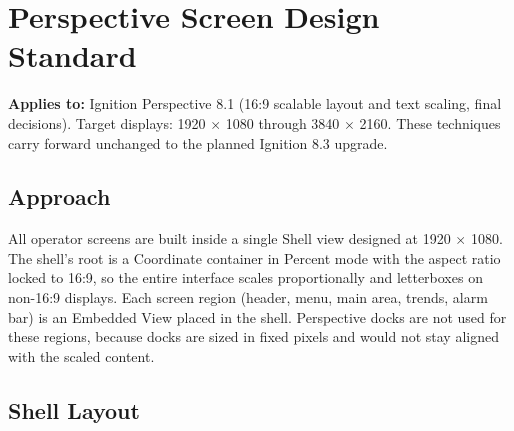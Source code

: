 \chapter{Perspective Screen Design Standard}
\label{app:screen-design}
\textbf{Applies to:} Ignition Perspective 8.1 (16:9 scalable layout and text scaling, final decisions). Target displays: 1920 $\times$ 1080 through 3840 $\times$ 2160. These techniques carry forward unchanged to the planned Ignition 8.3 upgrade.

\section{Approach}
All operator screens are built inside a single Shell view designed at 1920 $\times$ 1080. The shell's root is a Coordinate container in Percent mode with the aspect ratio locked to 16:9, so the entire interface scales proportionally and letterboxes on non-16:9 displays. Each screen region (header, menu, main area, trends, alarm bar) is an Embedded View placed in the shell. Perspective docks are not used for these regions, because docks are sized in fixed pixels and would not stay aligned with the scaled content.

\section{Shell Layout}
\begin{center}
\end{center}

